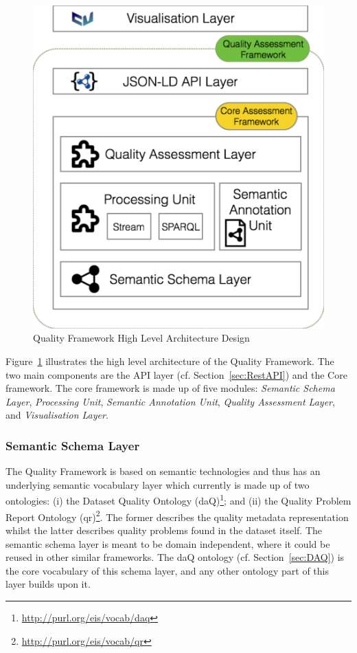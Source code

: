 \begin{figure}[tbph]
\center
\includegraphics[scale=0.3]{images/qualityFrameworkHLA.pdf} 
\caption{Quality Framework High Level Architecture Design} 
\label{fig:qualityFramework}
\end{figure}

Figure~\ref{fig:qualityFramework} illustrates the high level architecture of the Quality Framework.
The two main components are the API layer (cf. Section~\ref{sec:RestAPI}) and the Core framework.
The core framework is made up of five modules: \emph{Semantic Schema Layer}, \emph{Processing Unit}, \emph{Semantic Annotation Unit}, \emph{Quality Assessment Layer}, and \emph{Visualisation Layer}.

\subsubsection{Semantic Schema Layer}
The Quality Framework is based on semantic technologies and thus has an underlying semantic vocabulary layer which currently is made up of two ontologies: (i) the Dataset Quality Ontology (daQ)\footnote{\url{http://purl.org/eis/vocab/daq}}; and (ii) the Quality Problem Report Ontology (qr)\footnote{\url{http://purl.org/eis/vocab/qr}}. 
The former describes the quality metadata representation whilst the latter describes quality problems found in the dataset itself. 
The semantic schema layer is meant to be domain independent, where it could be reused in other similar frameworks. 
The daQ ontology (cf. Section~\ref{sec:DAQ}) is the core vocabulary of this schema layer, and any other ontology part of this layer builds upon it.

